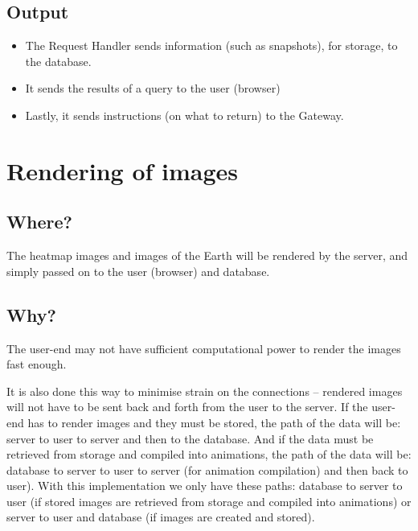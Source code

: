 \documentclass{article}
\begin{document}
\subsection{Output}
\begin{itemize}
\item{The Request Handler sends information (such as snapshots), for storage, to the database.}
\item{It sends the results of a query to the user (browser)}
\item{Lastly, it sends instructions (on what to return) to the Gateway.}
\end{itemize}

\section{Rendering of images}
\subsection{Where?}
The heatmap images and images of the Earth will be rendered by the server, and simply passed on to the user (browser) and database.
\subsection{Why?}
The user-end may not have sufficient computational power to render the images fast enough. 

It is also done this way to minimise strain on the connections -- rendered images will not have to be sent back and forth from the user to the server. If the user-end has to render images and they must be stored, the path of the data will be: server to user to server and then to the database. And if the data must be retrieved from storage and compiled into animations, the path of the data will be: database to server to user to server (for animation compilation) and then back to user). With this implementation we only have these paths: database to server to user (if stored images are retrieved from storage and compiled into animations) or server to user and database (if images are created and stored).
\end{document}
